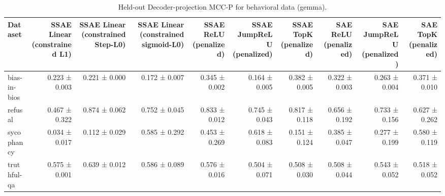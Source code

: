 \begin{table}[t]
\centering
\caption{Held-out Decoder-projection MCC-P for behavioral data (gemma).}
\label{tab:behavioral-gemma-decoder-projection-mcc-p}
\begin{tabular}{lrrrrrrrrr}
\toprule
Dataset & SSAE Linear (constrained L1) & SSAE Linear (constrained Step-L0) & SSAE Linear (constrained sigmoid-L0) & SSAE ReLU (penalized) & SSAE JumpReLU (penalized) & SSAE TopK (penalized) & SAE ReLU (penalized) & SAE JumpReLU (penalized) & SAE TopK (penalized) \\
\midrule
bias-in-bios & 0.223 ± 0.003 & 0.221 ± 0.000 & 0.172 ± 0.007 & 0.345 ± 0.002 & 0.164 ± 0.005 & 0.382 ± 0.005 & 0.322 ± 0.003 & 0.263 ± 0.004 & 0.371 ± 0.010 \\
refusal & 0.467 ± 0.322 & 0.874 ± 0.062 & 0.752 ± 0.045 & 0.833 ± 0.012 & 0.745 ± 0.043 & 0.817 ± 0.118 & 0.656 ± 0.192 & 0.733 ± 0.156 & 0.627 ± 0.262 \\
sycophancy & 0.034 ± 0.017 & 0.112 ± 0.029 & 0.585 ± 0.292 & 0.453 ± 0.269 & 0.618 ± 0.083 & 0.151 ± 0.124 & 0.385 ± 0.047 & 0.277 ± 0.199 & 0.580 ± 0.119 \\
truthful-qa & 0.575 ± 0.001 & 0.639 ± 0.012 & 0.586 ± 0.089 & 0.576 ± 0.016 & 0.504 ± 0.071 & 0.508 ± 0.030 & 0.508 ± 0.044 & 0.543 ± 0.052 & 0.518 ± 0.052 \\
\bottomrule
\end{tabular}
\end{table}
